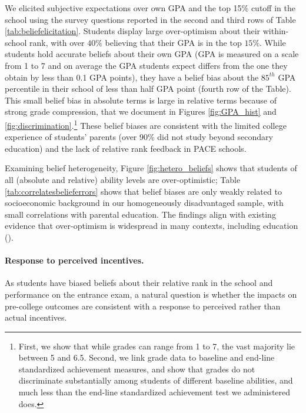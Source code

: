  We elicited subjective expectations over own GPA and the top 15\% cutoff in the school using the survey questions reported in the second and third rows of Table \ref{tab:beliefelicitation}. Students display large over-optimism about their within-school rank, with over $40\%$ believing that their GPA is in the top $15\%$. While students hold accurate beliefs about their own GPA (GPA is measured on a scale from 1 to 7 and on average the GPA students expect differs from the one they obtain by less than 0.1 GPA points), they have a belief bias about the $85^{th}$ GPA percentile in their school of less than half GPA point (fourth row of the Table). This small belief bias in absolute terms is large in relative terms because of strong grade compression, that we document in Figures \ref{fig:GPA_hist} and \ref{fig:discrimination}.\footnote{First, we show that while grades can range from 1 to 7, the vast majority lie between 5 and 6.5. Second, we link grade data to baseline and end-line standardized achievement measures, and show that grades do not discriminate substantially among students of different baseline abilities, and much less than the end-line standardized achievement test we administered does.} These belief biases are consistent with the limited college experience of students' parents (over 90\% did not study beyond secondary education) and the lack of relative rank feedback in PACE schools.\par 

\par 

\par 

Examining belief heterogeneity, Figure \ref{fig:hetero_beliefs} shows that students of all (absolute and relative) ability levels are over-optimistic; Table \ref{tab:correlatesbelieferrors} shows that belief biases are only weakly related to socioeconomic background in our homogeneously disadvantaged sample, with small correlations with parental education. The findings align with existing evidence that over-optimism is widespread in many contexts, including education (\citealp{stinebrickner2014major,hakimov2025confidence}).\par 
\paragraph{Response to perceived incentives.} As students have biased beliefs about their relative rank in the school and performance on the entrance exam, a natural question is whether the impacts on pre-college outcomes are consistent with a response to perceived rather than actual incentives.\par 

